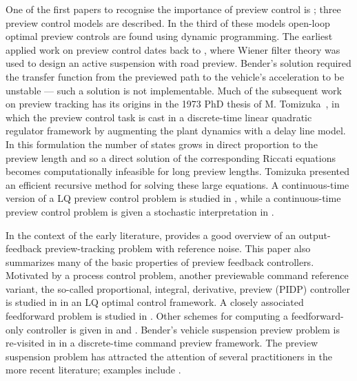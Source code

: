 One of the first papers to recognise the importance of preview control is \cite{Sheridan}; three preview control models are described. In the third of these models open-loop optimal preview controls are found using dynamic programming. The earliest applied work on preview control dates back to \cite{Bender_1968_PrevSusp}, where Wiener filter theory was used to design an active suspension with road preview. Bender's solution required the transfer function from the previewed path to the vehicle's acceleration to be unstable --- such a solution is not implementable. Much of the subsequent work on preview tracking has its origins in the 1973 PhD thesis of M. Tomizuka~\cite{Tomi_1973_Thesis}, in which  the preview control task is cast in a discrete-time linear quadratic regulator framework by augmenting the plant dynamics with a delay line model. In this formulation the number of states grows in direct proportion to the preview length and so a direct solution of the corresponding Riccati equations becomes computationally infeasible for long preview lengths. Tomizuka presented an efficient recursive method for solving these large equations. A continuous-time version of a LQ preview control problem is studied in \cite{Tomizuka_1975_ContinuousLQPreview}, while a continuous-time preview control problem is given a stochastic interpretation in \cite{Lindquist}.

In the context of the early literature, \cite{Tomizuka_1975_OptDiscretePreview} provides a good overview of an output-feedback preview-tracking problem with reference noise. This paper also summarizes many of the basic properties of preview feedback controllers. 
Motivated by a process control problem, another previewable command reference variant, the so-called proportional, integral, derivative, preview (PIDP) controller is studied in \cite{Tomizuka_1979_IntegralPreviewFI} in an LQ optimal control framework. A closely associated feedforward problem is studied in \cite{Tomi_1980_FFPrev}. Other schemes for computing a feedforward-only controller is given in \cite{Zattoni_2006_H2PreviewFF} and \cite{Marro_2005_FFH2Preview}. Bender's vehicle suspension preview problem is re-visited in \cite{Tomi_1976_SuspRevisited} in a discrete-time command preview framework. The preview suspension problem has attracted the attention of several practitioners in the more recent literature; examples include \cite{Hac_1992_Opt_Veh_Susp,Marzbanrad_2004_SuspPrev,Roh_1999_Stoc_Opt_Prev,Sharp_2005_CarHandlingPreview}.

